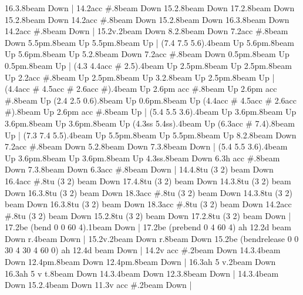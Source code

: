       16.3.8{beam Down}
    |
      14.2{acc #}.8{beam Down}
      15.2.8{beam Down}
      17.2.8{beam Down}
      15.2.8{beam Down}
      14.2{acc #}.8{beam Down}
      15.2.8{beam Down}
      16.3.8{beam Down}
      14.2{acc #}.8{beam Down}
    |
      15.2{v}.2{beam Down}
      8.2.8{beam Down}
      7.2{acc #}.8{beam Down}
      5.5{pm}.8{beam Up}
      5.5{pm}.8{beam Up}
    |
      (7.4 7.5 5.6).4{beam Up}
      5.6{pm}.8{beam Up}
      5.6{pm}.8{beam Up}
      5.2.8{beam Down}
      7.2{acc #}.8{beam Down}
      0.5{pm}.8{beam Up}
      0.5{pm}.8{beam Up}
    |
      (4.3 4.4{acc #} 2.5).4{beam Up}
      2.5{pm}.8{beam Up}
      2.5{pm}.8{beam Up}
      2.2{acc #}.8{beam Up}
      2.5{pm}.8{beam Up}
      3.2.8{beam Up}
      2.5{pm}.8{beam Up}
    |
      (4.4{acc #} 4.5{acc #} 2.6{acc #}).4{beam Up}
      2.6{pm acc #}.8{beam Up}
      2.6{pm acc #}.8{beam Up}
      (2.4 2.5 0.6).8{beam Up}
      0.6{pm}.8{beam Up}
      (4.4{acc #} 4.5{acc #} 2.6{acc #}).8{beam Up}
      2.6{pm acc #}.8{beam Up}
    |
      (5.4 5.5 3.6).4{beam Up}
      3.6{pm}.8{beam Up}
      3.6{pm}.8{beam Up}
      3.6{pm}.8{beam Up}
      (4.3{ss} 5.4{ss}).4{beam Up}
      (6.3{acc #} 7.4).8{beam Up}
    |
      (7.3 7.4 5.5).4{beam Up}
      5.5{pm}.8{beam Up}
      5.5{pm}.8{beam Up}
      8.2.8{beam Down}
      7.2{acc #}.8{beam Down}
      5.2.8{beam Down}
      7.3.8{beam Down}
    |
      (5.4 5.5 3.6).4{beam Up}
      3.6{pm}.8{beam Up}
      3.6{pm}.8{beam Up}
      4.3{ss}.8{beam Down}
      6.3{h acc #}.8{beam Down}
      7.3.8{beam Down}
      6.3{acc #}.8{beam Down}
    |
      14.4.8{tu (3 2) beam Down}
      16.4{acc #}.8{tu (3 2) beam Down}
      17.4.8{tu (3 2) beam Down}
      14.3.8{tu (3 2) beam Down}
      16.3.8{tu (3 2) beam Down}
      18.3{acc #}.8{tu (3 2) beam Down}
      14.3.8{tu (3 2) beam Down}
      16.3.8{tu (3 2) beam Down}
      18.3{acc #}.8{tu (3 2) beam Down}
      14.2{acc #}.8{tu (3 2) beam Down}
      15.2.8{tu (3 2) beam Down}
      17.2.8{tu (3 2) beam Down}
    |
      17.2{be (bend 0 0 60 4)}.1{beam Down}
    |
      17.2{be (prebend 0 4 60 4) ah 12}.2{d beam Down}
      r.4{beam Down}
    |
      15.2{v}.2{beam Down}
      r.8{beam Down}
      15.2{be (bendrelease 0 0 30 4 30 4 60 0) ah 12}.4{d beam Down}
    |
      14.2{v acc #}.2{beam Down}
      14.3.4{beam Down}
      12.4{pm}.8{beam Down}
      12.4{pm}.8{beam Down}
    |
      16.3{ah 5 v}.2{beam Down}
      16.3{ah 5 v t}.8{beam Down}
      14.3.4{beam Down}
      12.3.8{beam Down}
    |
      14.3.4{beam Down}
      15.2.4{beam Down}
      11.3{v acc #}.2{beam Down}
    |
